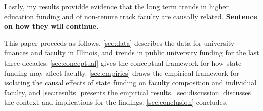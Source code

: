 Lastly, my results providde evidence that the long term trends in higher education funding and of non-tenure track faculty are causally related.
\textbf{Sentence on how they will continue.}

This paper proceeds as follows.
\autoref{sec:data} describes the data for university finances and faculty in Illinois, and trends in public university funding for the last three decades.
\autoref{sec:conceptual} gives the conceptual framework for how state funding may affect faculty.
\autoref{sec:empirics} draws the empirical framework for isolating the causal effects of state funding on faculty composition and individual faculty, and \autoref{sec:results} presents the empirical results.
\autoref{sec:discussion} discusses the context and implications for the findings.
\autoref{sec:conclusion} concludes.
